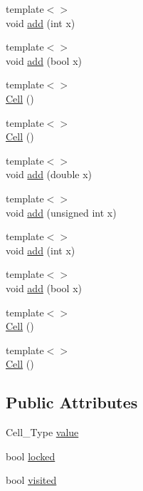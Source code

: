 \begin{DoxyCompactItemize}
\item 
{\footnotesize template$<$$>$ }\\void \hyperlink{class_cell_a74cb069c7341de33354c396465818c2f}{add} (int x)
\item 
{\footnotesize template$<$$>$ }\\void \hyperlink{class_cell_a0da6d3d39069cc22486442cc51c7685c}{add} (bool x)
\item 
{\footnotesize template$<$$>$ }\\\hyperlink{class_cell_a5ecdaddaf4661a9a8fe6f0ed61595847}{Cell} ()
\item 
{\footnotesize template$<$$>$ }\\\hyperlink{class_cell_aef4b64101b33e2349ceea132b962d137}{Cell} ()
\item 
{\footnotesize template$<$$>$ }\\void \hyperlink{class_cell_a64d4b92f322ccb8cfbad53f816d2caf8}{add} (double x)
\item 
{\footnotesize template$<$$>$ }\\void \hyperlink{class_cell_ae22060201cf692bbf219827453d0acd2}{add} (unsigned int x)
\item 
{\footnotesize template$<$$>$ }\\void \hyperlink{class_cell_a74cb069c7341de33354c396465818c2f}{add} (int x)
\item 
{\footnotesize template$<$$>$ }\\void \hyperlink{class_cell_a0da6d3d39069cc22486442cc51c7685c}{add} (bool x)
\item 
{\footnotesize template$<$$>$ }\\\hyperlink{class_cell_a5ecdaddaf4661a9a8fe6f0ed61595847}{Cell} ()
\item 
{\footnotesize template$<$$>$ }\\\hyperlink{class_cell_aef4b64101b33e2349ceea132b962d137}{Cell} ()
\end{DoxyCompactItemize}
\subsection*{Public Attributes}
\begin{DoxyCompactItemize}
\item 
Cell\+\_\+\+Type \hyperlink{class_cell_a5df1609bc0705830ec4dc6e177ddc955}{value}
\item 
bool \hyperlink{class_cell_a8188629882a0c9acad81eff9f89e3d6e}{locked}
\item 
bool \hyperlink{class_cell_a1f539a05953fa05d723c32e718f0eeb3}{visited}
\end{DoxyCompactItemize}


